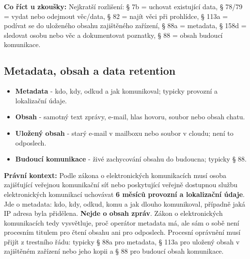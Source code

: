 \documentclass[11pt,a4paper]{article}
\newcommand{\zkouska}[1]{\begin{tcolorbox}[breakable,enhanced,colback=blue!7,colframe=blue!30!black,boxrule=0pt,arc=1mm,left=5pt,right=5pt,top=5pt,bottom=5pt,before skip=6pt,after skip=6pt]\textbf{Co říct u zkoušky:} #1\end{tcolorbox}}
\newcommand{\pravobox}[1]{\begin{tcolorbox}[breakable,enhanced,colback=yellow!18,colframe=yellow!45!black,boxrule=0pt,arc=1mm,left=5pt,right=5pt,top=5pt,bottom=5pt,before skip=6pt,after skip=6pt]\textbf{Právní kontext:} #1\end{tcolorbox}}
\begin{document}
\zkouska{Nejkratší rozlišení: § 7b = uchovat existující data, § 78/79 = vydat nebo odejmout věc/data, § 82 = najít věci při prohlídce, § 113a = podívat se do uloženého obsahu zajištěného zařízení, § 88a = metadata, § 158d = sledovat osobu nebo věc a dokumentovat poznatky, § 88 = obsah budoucí komunikace.}

\subsection*{Metadata, obsah a data retention}
\begin{itemize}
  \item \textbf{Metadata} - kdo, kdy, odkud a jak komunikoval; typicky provozní a lokalizační údaje.
  \item \textbf{Obsah} - samotný text zprávy, e-mail, hlas hovoru, soubor nebo obsah chatu.
  \item \textbf{Uložený obsah} - starý e-mail v mailboxu nebo soubor v cloudu; není to odposlech.
  \item \textbf{Budoucí komunikace} - živé zachycování obsahu do budoucna; typicky § 88.
\end{itemize}

\pravobox{Podle zákona o elektronických komunikacích musí osoba zajišťující veřejnou komunikační síť nebo poskytující veřejně dostupnou službu elektronických komunikací uchovávat \textbf{6 měsíců provozní a lokalizační údaje}. Jde o metadata: kdo, kdy, odkud, komu a jak dlouho komunikoval, případně jaká IP adresa byla přidělena. \textbf{Nejde o obsah zpráv}. Zákon o elektronických komunikacích tedy vysvětluje, proč operátor metadata má, ale sám o sobě není procesním titulem pro čtení obsahu ani pro odposlech. Procesní oprávnění musí přijít z trestního řádu: typicky § 88a pro metadata, § 113a pro uložený obsah v zajištěném zařízení nebo jeho kopii a § 88 pro budoucí obsah komunikace.}
\end{document}
